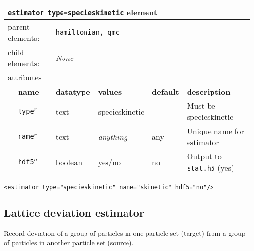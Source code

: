 \FloatBarrier
\begin{table}[h]
\begin{center}
\begin{tabularx}{\textwidth}{l l l l l X }
\hline
\multicolumn{6}{l}{\texttt{estimator type=specieskinetic} element} \\
\hline
\multicolumn{2}{l}{parent elements:} & \multicolumn{4}{l}{\texttt{hamiltonian, qmc}}\\
\multicolumn{2}{l}{child  elements:} & \multicolumn{4}{l}{\textit{None}}\\
\multicolumn{2}{l}{attributes}  & \multicolumn{4}{l}{}\\
   & \bfseries name       & \bfseries datatype & \bfseries values  & \bfseries default   & \bfseries description \\
   & \texttt{type}$^r$    &  text              & specieskinetic      &                     & Must be specieskinetic       \\
   & \texttt{name}$^r$    &  text              & \textit{anything} & any                 & Unique name for estimator \\
   & \texttt{hdf5}$^o$    &  boolean           & yes/no            & no                  & Output to \texttt{stat.h5} (yes) \\
  \hline
\end{tabularx}
\end{center}
\end{table}
\FloatBarrier


\begin{lstlisting}[style=QMCPXML,caption=Species kinetic energy estimator element.]
  <estimator type="specieskinetic" name="skinetic" hdf5="no"/>
\end{lstlisting}



\subsection{Lattice deviation estimator}
Record deviation of a group of particles in one particle set (target) from a group of particles in another particle set (source).

